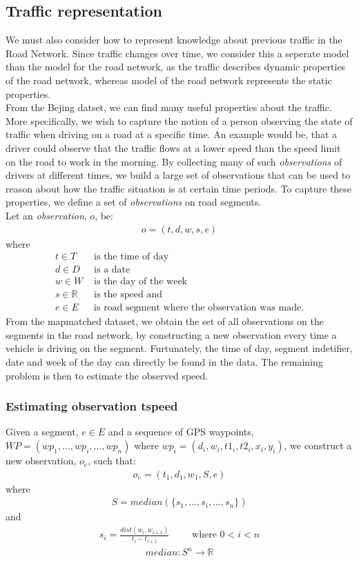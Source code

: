 \subsection{Traffic representation}\label{KR:traffic}
We must also consider how to represent knowledge about previous traffic in the Road Network. Since traffic changes over time, we consider this a seperate model than the model for the road network, as the traffic describes dynamic properties of the road network, whereas model of the road network represents the static properties.\\
From the Bejing datset, we can find many useful properties about the traffic. More specifically, we wish to capture the notion of a person observing the state of traffic when driving on a road at a specific time. An example would be, that a driver could observe that the traffic flows at a lower speed than the speed limit on the road to work in the morning. By collecting many of such \emph{observations} of drivers at different times, we build a large set of observations that can be used to reason about how the traffic situation is at certain time periods. To capture these properties, we define a set of \emph{observations} on road segments.\\
Let an \emph{observation}, $o$, be:
\begin{align*}
o = (t, d, w, s, e)
\end{align*}
where 
\begin{align*}
t \in T &\text{ is the time of day} \\
d \in D &\text{ is a date} \\
w \in W &\text{ is the day of the week} \\
s \in \mathbb{R} &\text{ is the speed and}\\
e \in E &\text{ is road segment where the observation was made.}
\end{align*}
From the mapmatched dataset, we obtain the set of all observations on the segments in the road network, by constructing a new observation every time a vehicle is driving on the segment. Furtunately, the time of day, segment indetifier, date and week of the day can directly be found in the data. The remaining problem is then to estimate the observed speed.

\subsubsection{Estimating observation tspeed}\label{KR:speed}
Given a segment, $e \in E$ and a sequence of GPS waypoints, $WP=(wp_1,...,wp_i,...,wp_n)$ where $wp_i = (d_i, w_i, t1_i, t2_i, x_i, y_i)$, we construct a new observation, $o_e$, such that:
\begin{align*}
o_e = (t_1, d_1, w_1, S, e)
\end{align*}
where
\begin{align*}
S = median(\{s_1,...,s_i,...,s_n\})
\end{align*}
and
\begin{align*}
s_i = \frac{dist(w_i, w_{i+1})}{t_i - t_{i+1}} \qquad \text{ where } 0 < i < n
\end{align*}
\begin{align*}
median: S^n \rightarrow \mathbb{R}
\end{align*}